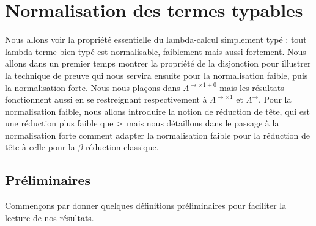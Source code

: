 \section{Normalisation des termes typables}

Nous allons voir la propriété essentielle du lambda-calcul simplement typé : tout lambda-terme bien typé est normalisable, faiblement mais aussi fortement. Nous allons dans un premier temps montrer la propriété de la disjonction pour illustrer la technique de preuve qui nous servira ensuite pour la normalisation faible, puis la normalisation forte. Nous nous plaçons dans $\Lambda^{\to\times 1+0}$ mais les résultats fonctionnent aussi en se restreignant respectivement à $\Lambda^{\to\times 1}$ et $\Lambda^\to$. Pour la normalisation faible, nous allons introduire la notion de réduction de tête, qui est une réduction plus faible que $\rhd$ mais nous détaillons dans le passage à la normalisation forte comment adapter la normalisation faible pour la réduction de tête à celle pour la $\beta$-réduction classique.

\subsection{Préliminaires}

Commençons par donner quelques définitions préliminaires pour faciliter la lecture de nos résultats.

